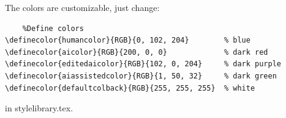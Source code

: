 \documentclass[11pt,reqno]{amsart}
\numberwithin{equation}{section}
\theoremstyle{definition}
\theoremstyle{remark}
\newcommand{\1}{\boldsymbol 1}
\begin{document}
The colors are customizable, just change:
\begin{verbatim}
    %Define colors
\definecolor{humancolor}{RGB}{0, 102, 204}        % blue
\definecolor{aicolor}{RGB}{200, 0, 0}             % dark red
\definecolor{editedaicolor}{RGB}{102, 0, 204}     % dark purple
\definecolor{aiassistedcolor}{RGB}{1, 50, 32}     % dark green
\definecolor{defaultcolback}{RGB}{255, 255, 255}  % white
\end{verbatim}
in {stylelibrary.tex}.
\end{document}
